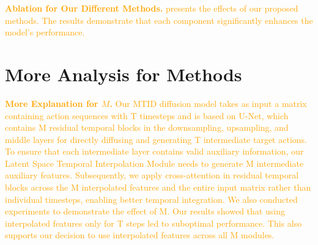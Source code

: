 
\textcolor{orange}{
\textbf{Ablation for Our Different Methods.} presents the effects of our proposed methods. The results demonstrate that each component significantly enhances the model's performance.
}


\section{More Analysis for Methods}

\textcolor{orange}{
\textbf{More Explanation for $M$. }Our MTID diffusion model takes as input a matrix containing action sequences with T timesteps and is based on U-Net, which contains M residual temporal blocks in the downsampling, upsampling, and middle layers for directly diffusing and generating T intermediate target actions. To ensure that each intermediate layer contains valid auxiliary information, our Latent Space Temporal Interpolation Module needs to generate M intermediate auxiliary features. Subsequently, we apply cross-attention in residual temporal blocks across the M interpolated features and the entire input matrix rather than individual timesteps, enabling better temporal integration. We also conducted experiments to demonstrate the effect of M. Our results showed that using interpolated features only for T steps led to suboptimal performance. This also supports our decision to use interpolated features across all M modules.
}



